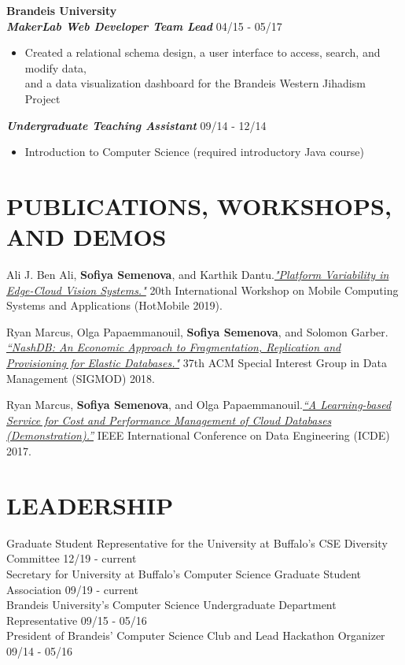 \documentclass{res}
\begin{document}
\begin{resume}
\textbf{\large{Brandeis University}}
\vspace{1mm} \\
\textbf{\textit{MakerLab Web Developer Team Lead}} \hfill 04/15 - 05/17 \\
	\begin{itemize}  \itemsep -1pt %
	\item Created a relational schema design, a user interface to access, search, and modify data, \\
		and a data visualization dashboard for the Brandeis Western Jihadism Project
	\end{itemize}
\textbf{\textit{Undergraduate Teaching Assistant}} \hfill 09/14 - 12/14 \\
	\begin{itemize}  \itemsep -1pt %
	\item Introduction to Computer Science (required introductory Java course)
	\end{itemize}
\vspace{2mm}

\section{PUBLICATIONS, WORKSHOPS, AND DEMOS}
\vspace{2mm}
	Ali J. Ben Ali, \textbf{Sofiya Semenova}, and Karthik Dantu.\href{https://dl.acm.org/citation.cfm?id=3309555}{\sl"Platform Variability in Edge-Cloud Vision Systems."} 20th International Workshop on Mobile Computing Systems and Applications (HotMobile 2019).
	
	 Ryan Marcus, Olga Papaemmanouil, \textbf{Sofiya Semenova}, and Solomon Garber. \href{https://api.zotero.org/users/3604318/publications/items/35KTECTC/file/view}{\sl “NashDB: An Economic Approach to Fragmentation, Replication and Provisioning for Elastic Databases."} 37th ACM Special Interest Group in Data Management (SIGMOD) 2018.
	 
	  Ryan Marcus, \textbf{Sofiya Semenova}, and Olga Papaemmanouil.\href{http://www.cs.brandeis.edu/~olga/publications/icde17-demo.pdf}{\sl “A Learning-based Service for Cost and Performance Management of Cloud Databases (Demonstration).”} IEEE International Conference on Data Engineering (ICDE) 2017.

\section{LEADERSHIP}  
\vspace{2mm}
{Graduate Student Representative for the University at Buffalo's CSE Diversity Committee}  \hfill 12/19 - current \\
{Secretary for University at Buffalo's Computer Science Graduate Student Association} \hfill 09/19 - current \\
{Brandeis University's Computer Science Undergraduate Department Representative} \hfill 09/15 - 05/16 \\
{President of Brandeis' Computer Science Club and Lead Hackathon Organizer} \hfill 09/14 - 05/16 
\vspace{2mm}


\end{resume}
\end{document}
